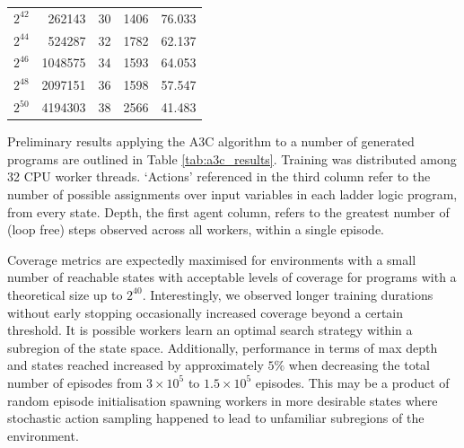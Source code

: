 \documentclass[runningheads]{llncs}
\begin{document}
\begin{table}[!t]
\begin{tabular}{rrrrr}
		\rowcolor[HTML]{FFFFFF} 
		$2^{42}$                                                              & 262143                                                                           & 30                           & 1406                      & 76.033                       \\
		\rowcolor[HTML]{FFFFFF} 
		$2^{44}$                                                              & 524287                                                                           & 32                           & 1782                      & 62.137                       \\
		\rowcolor[HTML]{FFFFFF} 
		$2^{46}$                                                              & 1048575                                                                          & 34                           & 1593                      & 64.053                       \\
		\rowcolor[HTML]{FFFFFF} 
		$2^{48}$                                                              & 2097151                                                                          & 36                           & 1598                      & 57.547                       \\
		\rowcolor[HTML]{FFFFFF} 
		$2^{50}$                                                              & 4194303                                                                          & 38                           & 2566                      & 41.483                       \\ \hline
	\end{tabular}
\end{table}

Preliminary results applying the A3C algorithm to a number of generated programs are outlined in Table \ref{tab:a3c_results}. Training was distributed among 32 CPU worker threads. `Actions' referenced in the third column refer to the number of possible assignments over input variables in each ladder logic program, from every state. Depth, the first agent column, refers to the greatest number of (loop free) steps observed across all workers, within a single episode.

Coverage metrics are expectedly maximised for environments with a small number of reachable states with acceptable levels of coverage for programs with a theoretical size up to $2^{40}$. Interestingly, we observed longer training durations without early stopping occasionally increased coverage beyond a certain threshold. It is possible workers learn an optimal search strategy within a subregion of the state space. Additionally, performance in terms of max depth and states reached increased by approximately $5\%$ when decreasing the total number of episodes from $3 \times 10^{5}$ to $1.5\times10^{5}$ episodes. This may be a product of random episode initialisation spawning workers in more desirable states where stochastic action sampling happened to lead to unfamiliar subregions of the environment.
\end{document}
